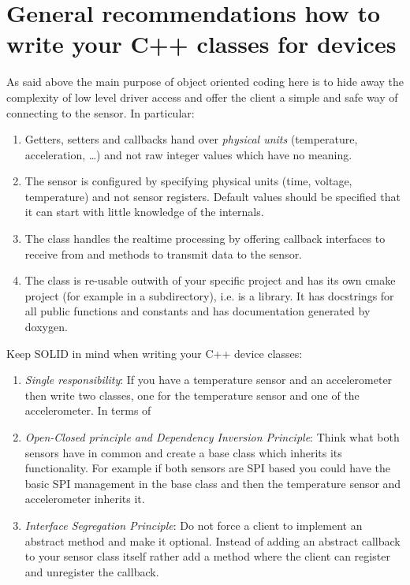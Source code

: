 \documentclass[12pt]{article}
\begin{document}
\section{General recommendations how to write your C++ classes for devices}
As said above the main purpose of object oriented coding here is to
hide away the complexity of low level driver access and offer the
client a simple and safe way of connecting to the sensor. In particular:
\begin{enumerate}
\item Getters, setters and callbacks hand over \textsl{physical units}
  (temperature, acceleration, \ldots) and not
  raw integer values which have no meaning.
\item The sensor is configured by specifying physical units (time, voltage,
  temperature) and not sensor registers. Default values should be
  specified that it can start with little knowledge of the internals.
\item The class handles the realtime processing by offering callback
  interfaces to receive from and methods to transmit data to the sensor.
\item The class is re-usable outwith of your specific project and has
  its own cmake project (for example in a subdirectory), i.e. is a
  library. It has docstrings for all public functions and constants
  and has documentation generated by doxygen.
\end{enumerate}

Keep SOLID in mind when writing your C++ device classes:
\begin{enumerate}
\item \textsl{Single responsibility}: If you have a temperature
sensor and an accelerometer then write two classes, one for the
temperature sensor and one of the accelerometer. In terms of
\item \textsl{Open-Closed principle and Dependency Inversion Principle}:
  Think what both sensors have
in common and create a base class which inherits its functionality.
For example if both sensors are SPI based you could have the basic
SPI management in the base class and then the temperature sensor
and accelerometer inherits it.
\item \textsl{Interface Segregation Principle}: Do not force
  a client to implement an abstract method and make it optional.
  Instead of adding an abstract callback to your sensor class itself
  rather add a method where the client can register and unregister
  the callback.
\end{enumerate}
\end{document}
